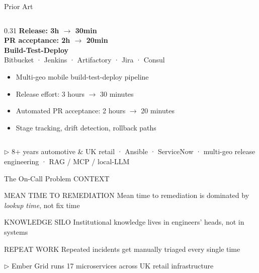 \documentclass[aspectratio=169,10pt]{beamer}
\newcommand{\slidecat}[1]{{\color{cdim}\ttfamily\scriptsize\MakeUppercase{#1}}}
\begin{document}
\begin{frame}{Prior Art}
\begin{columns}[T,onlytextwidth]
    \begin{column}{0.31\textwidth}
      {\color{camber}\ttfamily\tiny\bfseries Release: 3h $\rightarrow$ 30min}\\[0.04cm]
      {\color{camber}\ttfamily\tiny\bfseries PR acceptance: 2h $\rightarrow$ 20min}\\[0.08cm]
      {\color{ctext}\ttfamily\scriptsize\bfseries Build-Test-Deploy}\\[0.04cm]
      {\color{cdim}\tiny Bitbucket · Jenkins · Artifactory · Jira · Consul}\\[0.1cm]
      {\color{ctext}\tiny
      \begin{itemize}\setlength\itemsep{1pt}
        \item Multi-geo mobile build-test-deploy pipeline
        \item Release effort: 3 hours $\rightarrow$ 30 minutes
        \item Automated PR acceptance: 2 hours $\rightarrow$ 20 minutes
        \item Stage tracking, drift detection, rollback paths
      \end{itemize}}
      \priorboxend
    \end{column}
  \end{columns}
  \vspace{0.1cm}
  {\color{cdim}\ttfamily\tiny $\triangleright$ 8+ years automotive \& UK retail · Ansible · ServiceNow · multi-geo release engineering · RAG / MCP / local-LLM}
\end{frame}

\begin{frame}{The On-Call Problem}
  \slidecat{Context}
  \vspace{0.2cm}
  \begin{block}{\color{cgreen}\ttfamily\small MEAN TIME TO REMEDIATION}
    Mean time to remediation is dominated by \textit{lookup time}, not fix time
  \end{block}
  \vspace{0.15cm}
  \begin{block}{\color{cteal}\ttfamily\small KNOWLEDGE SILO}
    Institutional knowledge lives in engineers' heads, not in systems
  \end{block}
  \vspace{0.15cm}
  \begin{block}{\color{camber}\ttfamily\small REPEAT WORK}
    Repeated incidents get manually triaged every single time
  \end{block}
  \vspace{0.3cm}
  {\color{cdim}\ttfamily\small $\triangleright$ Ember Grid runs 17 microservices across UK retail infrastructure}
\end{frame}
\end{document}
